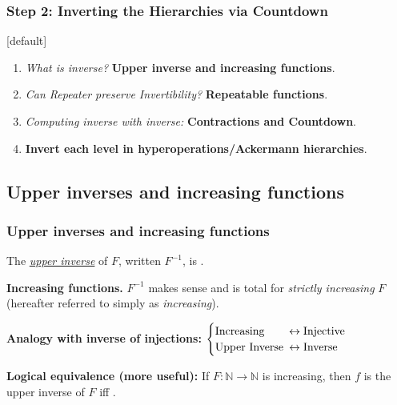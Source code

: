 \begin{frame}
\frametitle{Step 2: Inverting the Hierarchies via \textbf{Countdown}}
[default]

\begin{enumerate}[\bfseries 1.]
	\itemsep 3ex
	\pause
	\item<come@6->
	\emph{What is inverse?} \textbf{Upper inverse and increasing functions}.
	
	\item<3->
	\emph{Can Repeater preserve Invertibility?} \textbf{Repeatable functions}.
	
	\item<4->
	\emph{Computing inverse with inverse:} \textbf{Contractions and Countdown}.
	
	\item<5->
	\textbf{Invert each level in hyperoperations/Ackermann hierarchies}.
\end{enumerate}
\end{frame}


\subsection{Upper inverses and increasing functions}

\begin{frame}
\frametitle{Upper inverses and increasing functions}
The \href{https://github.com/inv-ack/inv-ack/blob/7270e64a2600b771f2b1b1b151f7d13fb2ae6c97/inverse.v\#L28-L45}{
	\emph{upper inverse}} of $F$, written $F^{-1}$,
is .


\bigskip

\textbf{Increasing functions.} $F^{-1}$ makes sense and is total for \emph{strictly increasing} $F$ (hereafter referred to simply as \emph{increasing}).

\bigskip

\textbf{Analogy with inverse of injections:} $\begin{cases}
\text{Increasing} & \hspace{-0.5em}\leftrightarrow \text{Injective} \\
\text{Upper Inverse} & \hspace{-0.5em}\leftrightarrow \text{Inverse}
\end{cases}$

\bigskip

\textbf{Logical equivalence (more useful):}
\href{https://github.com/inv-ack/inv-ack/blob/7270e64a2600b771f2b1b1b151f7d13fb2ae6c97/inverse.v\#L65-L77}{\coq} If $F:\mathbb{N}\to \mathbb{N}$ is increasing, then $f$ is the upper inverse of $F$ iff .

\end{frame}

